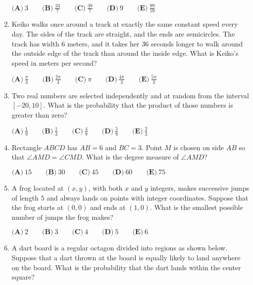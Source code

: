 \documentclass{article}
\begin{document}
\begin{enumerate}[label=\arabic*., itemsep=0.5em]
\(\textbf{(A)}\ 3 \qquad \textbf{(B)}\ \frac{33}{7} \qquad \textbf{(C)}\ \frac{39}{7} \qquad \textbf{(D)}\ 9 \qquad \textbf{(E)}\ \frac{99}{10}\)\par \vspace{0.5em}\item Keiko walks once around a track at exactly the same constant speed every day. The sides of the track are straight, and the ends are semicircles. The track has width \(6\) meters, and it takes her \(36\) seconds longer to walk around the outside edge of the track than around the inside edge. What is Keiko's speed in meters per second?

\(\textbf{(A)}\ \frac{\pi}{3} \qquad \textbf{(B)}\ \frac{2\pi}{3} \qquad \textbf{(C)}\ \pi \qquad \textbf{(D)}\ \frac{4\pi}{3} \qquad \textbf{(E)}\ \frac{5\pi}{3}\)\par \vspace{0.5em}\item Two real numbers are selected independently and at random from the interval \([-20,10]\).  What is the probability that the product of those numbers is greater than zero?

\(\textbf{(A)}\ \frac{1}{9} \qquad \textbf{(B)}\ \frac{1}{3} \qquad \textbf{(C)}\ \frac{4}{9} \qquad \textbf{(D)}\ \frac{5}{9} \qquad \textbf{(E)}\ \frac{2}{3}\)\par \vspace{0.5em}\item Rectangle \(ABCD\) has \(AB=6\) and \(BC=3\). Point \(M\) is chosen on side \(AB\) so that \(\angle AMD=\angle CMD\). What is the degree measure of \(\angle AMD\)?

\(\textbf{(A)}\ 15 \qquad \textbf{(B)}\ 30 \qquad \textbf{(C)}\ 45 \qquad \textbf{(D)}\ 60 \qquad \textbf{(E)}\ 75\)\par \vspace{0.5em}\item A frog located at \((x,y)\), with both \(x\) and \(y\) integers, makes successive jumps of length \(5\) and always lands on points with integer coordinates. Suppose that the frog starts at \((0,0)\) and ends at \((1,0)\). What is the smallest possible number of jumps the frog makes?

\(\textbf{(A)}\ 2 \qquad \textbf{(B)}\ 3 \qquad \textbf{(C)}\ 4 \qquad \textbf{(D)}\ 5 \qquad \textbf{(E)}\ 6\)\par \vspace{0.5em}\item A dart board is a regular octagon divided into regions as shown below. Suppose that a dart thrown at the board is equally likely to land anywhere on the board. What is the probability that the dart lands within the center square?



\end{enumerate}
\end{document}
